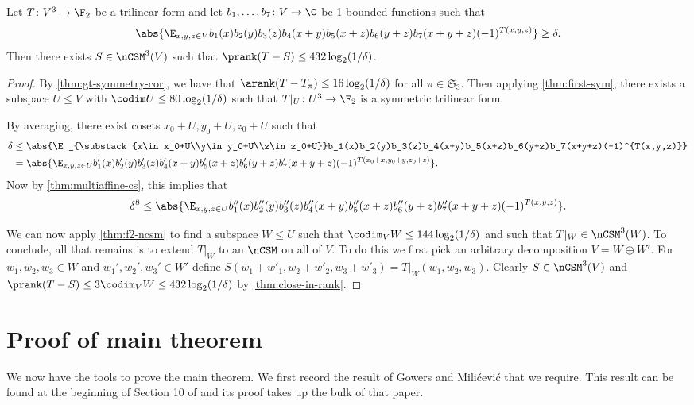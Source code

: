 \begin{cor}
\label{thm:f2-ncsm-cor}
Let $T\colon V^3\to\F_2$ be a trilinear form and let $b_1,\ldots,b_7\colon V\to\C$ be 1-bounded functions such that
\[\abs{\E_{x,y,z\in V}b_1(x)b_2(y)b_3(z)b_4(x+y)b_5(x+z)b_6(y+z)b_7(x+y+z)(-1)^{T(x,y,z)}}\geq\delta.\]
Then there exists $S\in\nCSM^3(V)$ such that $\prank(T-S)\leq 432\log_2(1/\delta)$.
\end{cor}

\begin{proof}
By \cref{thm:gt-symmetry-cor}, we have that $\arank(T-T_\pi)\leq 16\log_2(1/\delta)$ for all $\pi\in\mathfrak S_3$. Then applying \cref{thm:first-sym}, there exists a subspace $U\leq V$ with $\codim U\leq 80\log_2(1/\delta)$ such that $T|_U\colon U^3\to\F_2$ is a symmetric trilinear form.

By averaging, there exist cosets $x_0+U,y_0+U,z_0+U$ such that
\begin{align*}
\delta
&\leq\abs{\E_{\substack{x\in x_0+U\\y\in y_0+U\\z\in z_0+U}}b_1(x)b_2(y)b_3(z)b_4(x+y)b_5(x+z)b_6(y+z)b_7(x+y+z)(-1)^{T(x,y,z)}}\\
&=\abs{\E_{x,y,z\in U}b'_1(x)b'_2(y)b'_3(z)b'_4(x+y)b'_5(x+z)b'_6(y+z)b'_7(x+y+z)(-1)^{T(x_0+x,y_0+y,z_0+z)}}.
\end{align*}
Now by \cref{thm:multiaffine-cs}, this implies that 
\[\delta^8\leq\abs{\E_{x,y,z\in U}b''_1(x)b''_2(y)b''_3(z)b''_4(x+y)b''_5(x+z)b''_6(y+z)b''_7(x+y+z)(-1)^{T(x,y,z)}}.\]

We can now apply \cref{thm:f2-ncsm} to find a subspace $W\leq U$ such that $\codim_V W\leq 144\log_2(1/\delta)$ and such that $T|_W\in\nCSM^3(W)$. To conclude, all that remains is to extend $T|_W$ to an $\nCSM$ on all of $V$. To do this we first pick an arbitrary decomposition $V=W\oplus W'$. For $w_1,w_2,w_3\in W$ and $w_1',w_2',w_3'\in W'$ define $S(w_1+ w'_1,w_2+ w'_2,w_3+ w'_3)=T|_W(w_1,w_2,w_3)$. Clearly $S\in\nCSM^3(V)$ and $\prank(T-S)\leq 3\codim_V W\leq 432\log_2(1/\delta)$ by \cref{thm:close-in-rank}.
\end{proof}

\section{Proof of main theorem}
\label{sec:proof-of-main}

We now have the tools to prove the main theorem. We first record the result of Gowers and Mili\'cevi\'c that we require. This result can be found at the beginning of Section 10 of \cite{GM17} and its proof takes up the bulk of that paper.


